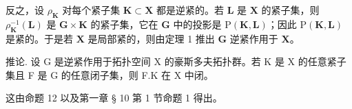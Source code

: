 反之，设 \(\rho_{\mathbf{K}}\) 对每个紧子集 \(\mathbf{K} \subset \mathbf{X}\) 都是逆紧的。若 \(\mathbf{L}\) 是 \(\mathbf{X}\) 的紧子集，则 \(\rho_{\mathbf{K}}^{-1}(\mathbf{L})\) 是 \(\mathbf{G} \times \mathbf{K}\) 的紧子集，它在 \(\mathbf{G}\) 中的投影是 \(\mathrm{P}(\mathbf{K}, \mathbf{L})\)；因此 \(\mathrm{P}(\mathbf{K}, \mathbf{L})\) 是紧的。于是若 \(\mathbf{X}\) 是局部紧的，则由定理 1 推出 \(\mathbf{G}\) 逆紧作用于 \(\mathbf{X}\)。

推论. 设 G 是逆紧作用于拓扑空间 X 的豪斯多夫拓扑群。若 K 是 X 的任意紧子集且 F 是 G 的任意闭子集，则 F.K 在 X 中闭。

这由命题 12 以及第一章 § 10 第 1 节命题 1 得出。

